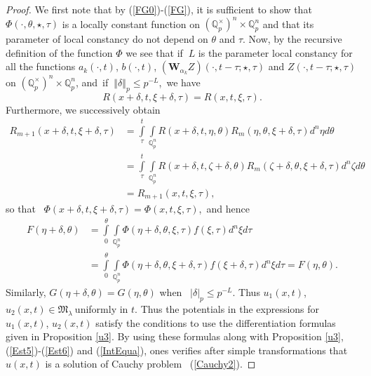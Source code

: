 \documentclass{amsart}\usepackage{amsfonts}
\theoremstyle{plain}
\numberwithin{equation}{section}
\begin{document}
\begin{proof}
We first note that by (\ref{FG0})-(\ref{FG}), it is sufficient to show that
$\Phi(\cdot,\theta,\star,\tau)$ is a locally constant function on $\left(
\mathbb{Q}_{p}^{\times}\right)  ^{n}\times\mathbb{Q}_{p}^{n}$ and that its
parameter of local constancy do not depend on $\theta$ and $\tau$. Now, by the
recursive definition of the function $\Phi$ we see that if $\ L$ is the
parameter local constancy for all the functions $a_{k}(\cdot,t)$, $b(\cdot
,t)$, $(\boldsymbol{\mathbf{W}}_{\alpha_{k}}Z)(\cdot,t-\tau;\star,\tau)$ and
$Z(\cdot,t-\tau;\star,\tau)$ on $\left(  \mathbb{Q}_{p}^{\times}\right)
^{n}\times\mathbb{Q}_{p}^{n}$, and\ if $\ \left\Vert \delta\right\Vert
_{p}\leq p^{-L}$,\ we have\[
R(x+\delta,t,\xi+\delta,\tau)=R(x,t,\xi,\tau).
\]
Furthermore, we successively obtain\begin{align*}
R_{m+1}(x+\delta,t,\xi+\delta,\tau)  &  ={\displaystyle\int\limits_{\tau}^{t}}
\underset{\mathbb{Q}_{p}^{n}}{\int}R(x+\delta,t,\eta,\theta)R_{m}(\eta
,\theta,\xi+\delta,\tau)d^{n}\eta d\theta\\
&  ={\displaystyle\int\limits_{\tau}^{t}}
\underset{\mathbb{Q}_{p}^{n}}{\int}R(x+\delta,t,\zeta+\delta,\theta
)R_{m}(\zeta+\delta,\theta,\xi+\delta,\tau)d^{n}\zeta d\theta\\
&  =R_{m+1}(x,t,\xi,\tau),
\end{align*}
so that \ $\Phi(x+\delta,t,\xi+\delta,\tau)=\Phi(x,t,\xi,\tau)$,\ and hence\begin{align*}
F(\eta+\delta,\theta)  &  ={\displaystyle\int\limits_{0}^{\theta}}
{\displaystyle\int\limits_{\mathbb{Q}_{p}^{n}}}
\Phi(\eta+\delta,\theta,\xi,\tau)f(\xi,\tau)d^{n}\xi d\tau\\
&  ={\displaystyle\int\limits_{0}^{\theta}}
{\displaystyle\int\limits_{\mathbb{Q}_{p}^{n}}}
\Phi(\eta+\delta,\theta,\xi+\delta,\tau)f(\xi+\delta,\tau)d^{n}\xi
d\tau=F(\eta,\theta).
\end{align*}
Similarly, $G(\eta+\delta,\theta)=G(\eta,\theta)$ when \ $\left\vert
\delta\right\vert _{p}\leq p^{-L}$. Thus $u_{1}(x,t)$, $u_{2}(x,t)\in
\mathcal{\mathfrak{M}}_{\lambda}\ $uniformly in $t$. Thus the potentials in
the expressions for $u_{1}(x,t)$, $u_{2}(x,t)$ satisfy the conditions to use
the differentiation formulas given in Proposition \ref{u3}. By using these
formulas along with Proposition \ref{u3}, (\ref{Est5})-(\ref{Est6}) and
(\ref{IntEqua}), ones verifies after simple transformations that $u(x,t)$ is a
solution of Cauchy problem \ (\ref{Cauchy2}).


\end{proof}
\end{document}
